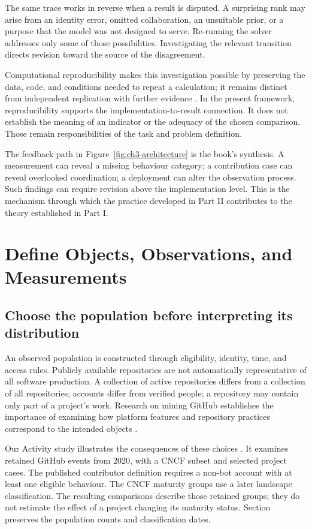 The same trace works in reverse when a result is disputed. A surprising rank may arise from an identity error, omitted collaboration, an unsuitable prior, or a purpose that the model was not designed to serve. Re-running the solver addresses only some of those possibilities. Investigating the relevant transition directs revision toward the source of the disagreement.

Computational reproducibility makes this investigation possible by preserving the data, code, and conditions needed to repeat a calculation; it remains distinct from independent replication with further evidence \citep{peng2011}. In the present framework, reproducibility supports the implementation-to-result connection. It does not establish the meaning of an indicator or the adequacy of the chosen comparison. Those remain responsibilities of the task and problem definition.

The feedback path in Figure~\ref{fig:ch3-architecture} is the book's synthesis. A measurement can reveal a missing behaviour category; a contribution case can reveal overlooked coordination; a deployment can alter the observation process. Such findings can require revision above the implementation level. This is the mechanism through which the practice developed in Part II contributes to the theory established in Part I.

\section{Define Objects, Observations, and Measurements}
\label{sec:ch3-evidence}

\subsection{Choose the population before interpreting its distribution}
An observed population is constructed through eligibility, identity, time, and access rules. Publicly available repositories are not automatically representative of all software production. A collection of active repositories differs from a collection of all repositories; accounts differ from verified people; a repository may contain only part of a project's work. Research on mining GitHub establishes the importance of examining how platform features and repository practices correspond to the intended objects \citep{kalliamvakou2014}.

Our Activity study illustrates the consequences of these choices \citep{xia2022}. It examines retained GitHub events from 2020, with a CNCF subset and selected project cases. The published contributor definition requires a non-bot account with at least one eligible behaviour. The CNCF maturity groups use a later landscape classification. The resulting comparisons describe those retained groups; they do not estimate the effect of a project changing its maturity status. Section~ preserves the population counts and classification dates.


